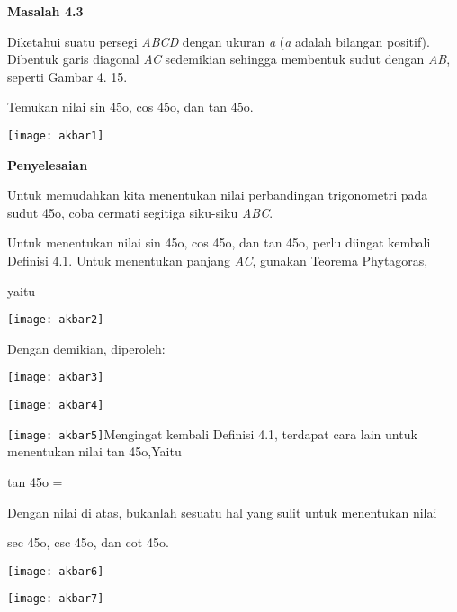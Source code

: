 \documentclass[11pt,fleqn]{book} %
\begin{document}
\noindent \textbf{Masalah 4.3}

\noindent Diketahui suatu persegi \textit{ABCD }dengan ukuran \textit{a }(\textit{a }adalah bilangan positif). Dibentuk garis diagonal \textit{AC }sedemikian sehingga membentuk sudut dengan \textit{AB}, seperti Gambar 4. 15. 

\noindent Temukan nilai sin 45o, cos 45o, dan tan 45o.

\noindent \texttt{[image: akbar1]}

\noindent \textbf{Penyelesaian}

\noindent Untuk memudahkan kita menentukan nilai perbandingan trigonometri pada sudut 45o, coba cermati segitiga siku-siku \textit{ABC}.

\noindent Untuk menentukan nilai sin 45o, cos 45o, dan tan 45o, perlu diingat kembali Definisi 4.1. Untuk menentukan panjang \textit{AC}, gunakan Teorema Phytagoras,

\noindent yaitu

\noindent \texttt{[image: akbar2]}

\noindent 

\noindent Dengan demikian, diperoleh:

\noindent 

\noindent \texttt{[image: akbar3]}

\noindent \texttt{[image: akbar4]}

\noindent \texttt{[image: akbar5]}Mengingat kembali Definisi 4.1, terdapat cara lain untuk menentukan nilai tan 45o,Yaitu

\noindent 

\noindent tan 45o = 

\noindent 

\noindent 

\noindent Dengan nilai di atas, bukanlah sesuatu hal yang sulit untuk menentukan nilai

\noindent sec 45o, csc 45o, dan cot 45o.

\noindent \texttt{[image: akbar6]}

\noindent 

\noindent \texttt{[image: akbar7]}
\end{document}
